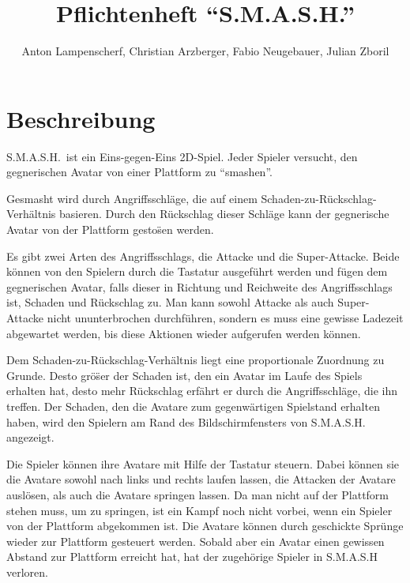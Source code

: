 \documentclass[11pt]{article}
\title{Pflichtenheft \textquotedblleft S.M.A.S.H.\textquotedblright}
\author{Anton Lampenscherf, Christian Arzberger, Fabio Neugebauer, Julian Zboril}
\newcommand{\paragraphspace}{0.3cm}
\begin{document}
    \maketitle

    \section{Beschreibung}\label{sec:beschreibung}
    S.M.A.S.H.\ ist ein Eins-gegen-Eins 2D-Spiel.
    Jeder Spieler versucht, den gegnerischen Avatar von einer Plattform zu \textquotedblleft smashen\textquotedblright.
    \vspace{\paragraphspace}

    \noindent
    Gesmasht wird durch Angriffsschl\"age, die auf einem Schaden-zu-R\"uckschlag-Verh\"altnis basieren.
    Durch den R\"uckschlag dieser Schl\"age kann der gegnerische Avatar von der Plattform gesto\"sen werden.
    \vspace{\paragraphspace}

    \noindent
    Es gibt zwei Arten des Angriffsschlags, die Attacke und die Super-Attacke.
    Beide k\"onnen von den Spielern durch die Tastatur ausgef\"uhrt werden und f\"ugen dem gegnerischen Avatar, falls dieser in Richtung und Reichweite des Angriffsschlags ist, Schaden und R\"uckschlag zu.
    Man kann sowohl Attacke als auch Super-Attacke nicht ununterbrochen durchf\"uhren, sondern es muss eine gewisse Ladezeit abgewartet werden, bis diese Aktionen wieder aufgerufen werden k\"onnen.
    \vspace{\paragraphspace}

    \noindent
    Dem Schaden-zu-R\"uckschlag-Verh\"altnis liegt eine proportionale Zuordnung zu Grunde.
    Desto gr\"o\"ser der Schaden ist, den ein Avatar im Laufe des Spiels erhalten hat, desto mehr R\"uckschlag erf\"ahrt er durch die Angriffsschl\"age, die ihn treffen.
    Der Schaden, den die Avatare zum gegenw\"artigen Spielstand erhalten haben, wird den Spielern am Rand des Bildschirmfensters von S.M.A.S.H. angezeigt.
    \vspace{\paragraphspace}

    \noindent
    Die Spieler k\"onnen ihre Avatare mit Hilfe der Tastatur steuern.
    Dabei k\"onnen sie die Avatare sowohl nach links und rechts laufen lassen, die Attacken der Avatare ausl\"osen, als auch die Avatare springen lassen.
    Da man nicht auf der Plattform stehen muss, um zu springen, ist ein Kampf noch nicht vorbei, wenn ein Spieler von der Plattform abgekommen ist.
    Die Avatare k\"onnen durch geschickte Spr\"unge wieder zur Plattform gesteuert werden.
    Sobald aber ein Avatar einen gewissen Abstand zur Plattform erreicht hat, hat der zugeh\"orige Spieler in S.M.A.S.H verloren.
    \vspace{\paragraphspace}
\end{document}
